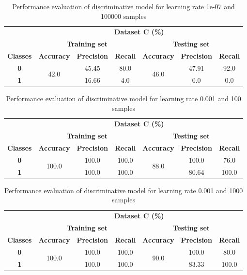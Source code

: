 \documentclass{article}
\begin{document}
  \begin{table}[h]
  \centering
  \caption{Performance evaluation of discriminative model for learning rate 1e-07 and 100000 samples} \label{tab:7}
  \begin{tabular}{ccccccc}
  \cline{2-7}
  & \multicolumn{6}{c}{\textbf{Dataset C (\%)}} \\ \cline{2-7}
  & \multicolumn{3}{c}{\textbf{Training set}} & \multicolumn{3}{c}{\textbf{Testing set}} \\ \hline
  \textbf{Classes} & \textbf{Accuracy} & \textbf{Precision} & \textbf{Recall} & \textbf{Accuracy} & \textbf{Precision} & \textbf{Recall} \\ \hline
  \textbf{0} & \multirow{2}{*}{42.0} & 45.45 & 80.0 & \multirow{2}{*}{46.0} & 47.91 & 92.0 \\ \cline{1-1} \cline{3-4} \cline{6-7} 
  \textbf{1} &  & 16.66 & 4.0 &  & 0.0 & 0.0 \\ \hline
  \end{tabular}
  \end{table}
  
  \begin{table}[h]
  \centering
  \caption{Performance evaluation of discriminative model for learning rate 0.001 and 100 samples} \label{tab:8}
  \begin{tabular}{ccccccc}
  \cline{2-7}
  & \multicolumn{6}{c}{\textbf{Dataset C (\%)}} \\ \cline{2-7}
  & \multicolumn{3}{c}{\textbf{Training set}} & \multicolumn{3}{c}{\textbf{Testing set}} \\ \hline
  \textbf{Classes} & \textbf{Accuracy} & \textbf{Precision} & \textbf{Recall} & \textbf{Accuracy} & \textbf{Precision} & \textbf{Recall} \\ \hline
  \textbf{0} & \multirow{2}{*}{100.0} & 100.0 & 100.0 & \multirow{2}{*}{88.0} & 100.0 & 76.0 \\ \cline{1-1} \cline{3-4} \cline{6-7} 
  \textbf{1} &  & 100.0 & 100.0 &  & 80.64 & 100.0 \\ \hline
  \end{tabular}
  \end{table}
  
  \begin{table}[h]
  \centering
  \caption{Performance evaluation of discriminative model for learning rate 0.001 and 1000 samples} \label{tab:9}
  \begin{tabular}{ccccccc}
  \cline{2-7}
  & \multicolumn{6}{c}{\textbf{Dataset C (\%)}} \\ \cline{2-7}
  & \multicolumn{3}{c}{\textbf{Training set}} & \multicolumn{3}{c}{\textbf{Testing set}} \\ \hline
  \textbf{Classes} & \textbf{Accuracy} & \textbf{Precision} & \textbf{Recall} & \textbf{Accuracy} & \textbf{Precision} & \textbf{Recall} \\ \hline
  \textbf{0} & \multirow{2}{*}{100.0} & 100.0 & 100.0 & \multirow{2}{*}{90.0} & 100.0 & 80.0 \\ \cline{1-1} \cline{3-4} \cline{6-7} 
  \textbf{1} &  & 100.0 & 100.0 &  & 83.33 & 100.0 \\ \hline
  \end{tabular}
  \end{table}
  
\end{document}
